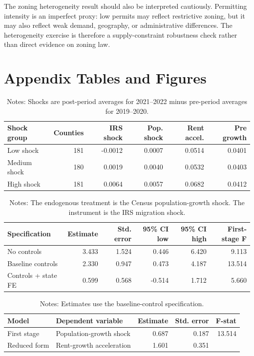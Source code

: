 \documentclass[11pt]{article}
\begin{document}
The zoning heterogeneity result should also be interpreted cautiously. Permitting intensity is an imperfect proxy: low permits may reflect restrictive zoning, but it may also reflect weak demand, geography, or administrative differences. The heterogeneity exercise is therefore a supply-constraint robustness check rather than direct evidence on zoning law.

\clearpage
\appendix
\section{Appendix Tables and Figures}

\begin{table}[h!]
\centering
\caption{Summary by IRS Migration-Shock Tercile}
\label{tab:shockbin}
\small
\begin{tabular}{lrrrrr}
\toprule
Shock group & Counties & IRS shock & Pop. shock & Rent accel. & Pre growth \\
\midrule
Low shock & 181 & -0.0012 & 0.0007 & 0.0514 & 0.0401 \\
Medium shock & 180 & 0.0019 & 0.0040 & 0.0532 & 0.0403 \\
High shock & 181 & 0.0064 & 0.0057 & 0.0682 & 0.0412 \\
\bottomrule
\end{tabular}
\caption*{\footnotesize Notes: Shocks are post-period averages for 2021--2022 minus pre-period averages for 2019--2020.}
\end{table}

\begin{table}[h!]
\centering
\caption{IV Estimates}
\label{tab:iv}
\small
\begin{tabular}{lrrrrr}
\toprule
Specification & Estimate & Std. error & 95\% CI low & 95\% CI high & First-stage F \\
\midrule
No controls & 3.433 & 1.524 & 0.446 & 6.420 & 9.113 \\
Baseline controls & 2.330 & 0.947 & 0.473 & 4.187 & 13.514 \\
Controls + state FE & 0.599 & 0.568 & -0.514 & 1.712 & 5.660 \\
\bottomrule
\end{tabular}
\caption*{\footnotesize Notes: The endogenous treatment is the Census population-growth shock. The instrument is the IRS migration shock.}
\end{table}

\begin{table}[h!]
\centering
\caption{First Stage and Reduced Form}
\label{tab:fsrf}
\begin{tabular}{llrrr}
\toprule
Model & Dependent variable & Estimate & Std. error & F-stat \\
\midrule
First stage & Population-growth shock & 0.687 & 0.187 & 13.514 \\
Reduced form & Rent-growth acceleration & 1.601 & 0.351 &  \\
\bottomrule
\end{tabular}
\caption*{\footnotesize Notes: Estimates use the baseline-control specification.}
\end{table}
\end{document}
